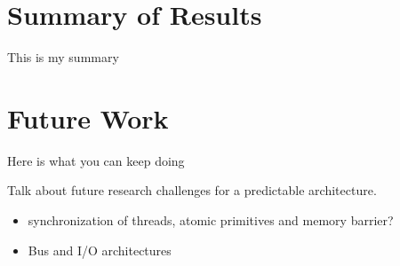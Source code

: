 \section{Summary of Results}

This is my summary

\section{Future Work}

Here is what you can keep doing

Talk about future research challenges for a predictable architecture.
\begin{itemize}
  \item synchronization of threads, atomic primitives and memory barrier?
  \item Bus and I/O architectures
\end{itemize}
